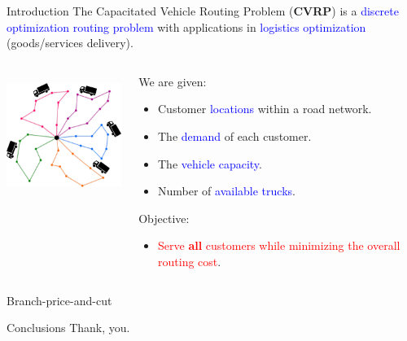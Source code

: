 \begin{frame}
	\maketitle
\end{frame}

\begin{frame}{Introduction}
	The Capacitated Vehicle Routing Problem (\textbf{CVRP}) is a \textcolor{blue}{discrete optimization routing problem} with applications in \textcolor{blue}{logistics optimization} (goods/services delivery).

	\vspace{0.5cm}

	\begin{columns}
		\begin{column}{.35\textwidth}
			\centering
			\includegraphics[height=4cm]{Imgs/CVRP-example-without-truck.out.cropped.pdf}
		\end{column}
		\begin{column}{.65\textwidth}
			We are given:
			\begin{itemize}
				\item Customer \textcolor{blue}{locations} within a road network.
				\item The \textcolor{blue}{demand} of each customer.
				\item The \textcolor{blue}{vehicle capacity}.
				\item Number of \textcolor{blue}{available trucks}.
			\end{itemize}
			Objective:
			\begin{itemize}
				\item \textcolor{red}{Serve \textbf{all} customers while minimizing the overall routing cost}.
			\end{itemize}
		\end{column}
	\end{columns}

\end{frame}

\begin{frame}{Branch-price-and-cut}
\end{frame}

\begin{frame}{Conclusions}
	Thank, you.

	\cite{jepsen2014}
\end{frame}

\begin{frame}
	\maketitle
\end{frame}
